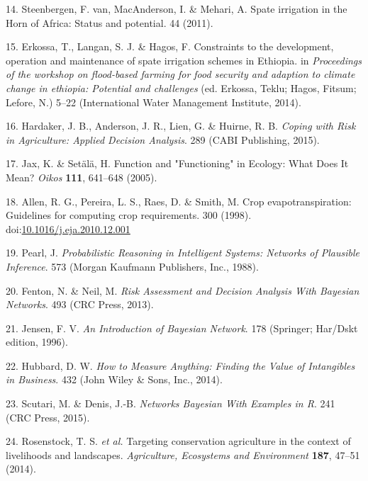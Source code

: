 \documentclass[12pt,oneside]{article}
\begin{document}
\leavevmode\hypertarget{ref-VanSteenbergen_et_al_2011}{}%
14. Steenbergen, F. van, MacAnderson, I. \& Mehari, A. Spate irrigation
in the Horn of Africa: Status and potential. 44 (2011).

\leavevmode\hypertarget{ref-Erkossa_et_al_2014}{}%
15. Erkossa, T., Langan, S. J. \& Hagos, F. Constraints to the
development, operation and maintenance of spate irrigation schemes in
Ethiopia. in \emph{Proceedings of the workshop on flood-based farming
for food security and adaption to climate change in ethiopia: Potential
and challenges} (ed. Erkossa, Teklu; Hagos, Fitsum; Lefore, N.) 5--22
(International Water Management Institute, 2014).

\leavevmode\hypertarget{ref-Hardaker_et_al_2015}{}%
16. Hardaker, J. B., Anderson, J. R., Lien, G. \& Huirne, R. B.
\emph{Coping with Risk in Agriculture: Applied Decision Analysis}. 289
(CABI Publishing, 2015).

\leavevmode\hypertarget{ref-Jax_and_Setala_2005}{}%
17. Jax, K. \& Setälä, H. Function and "Functioning" in Ecology: What
Does It Mean? \emph{Oikos} \textbf{111}, 641--648 (2005).

\leavevmode\hypertarget{ref-Allen_et_al_1998}{}%
18. Allen, R. G., Pereira, L. S., Raes, D. \& Smith, M. Crop
evapotranspiration: Guidelines for computing crop requirements. 300
(1998).
doi:\href{https://doi.org/10.1016/j.eja.2010.12.001}{10.1016/j.eja.2010.12.001}

\leavevmode\hypertarget{ref-Pearl_1988}{}%
19. Pearl, J. \emph{Probabilistic Reasoning in Intelligent Systems:
Networks of Plausible Inference}. 573 (Morgan Kaufmann Publishers, Inc.,
1988).

\leavevmode\hypertarget{ref-Fenton_and_Neil_2013}{}%
20. Fenton, N. \& Neil, M. \emph{Risk Assessment and Decision Analysis
With Bayesian Networks}. 493 (CRC Press, 2013).

\leavevmode\hypertarget{ref-Jensen_1996}{}%
21. Jensen, F. V. \emph{An Introduction of Bayesian Network}. 178
(Springer; Har/Dskt edition, 1996).

\leavevmode\hypertarget{ref-Hubbard_2014}{}%
22. Hubbard, D. W. \emph{How to Measure Anything: Finding the Value of
Intangibles in Business}. 432 (John Wiley \& Sons, Inc., 2014).

\leavevmode\hypertarget{ref-Scutari_and_Denis_2015}{}%
23. Scutari, M. \& Denis, J.-B. \emph{Networks Bayesian With Examples in
R}. 241 (CRC Press, 2015).

\leavevmode\hypertarget{ref-Rosenstock_et_al_2014}{}%
24. Rosenstock, T. S. \emph{et al.} Targeting conservation agriculture
in the context of livelihoods and landscapes. \emph{Agriculture,
Ecosystems and Environment} \textbf{187}, 47--51 (2014).
\end{document}
